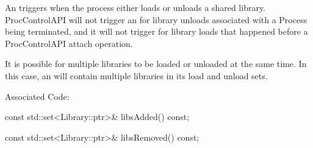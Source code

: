 
An  triggers when the process either loads or unloads a
shared library. ProcControlAPI will not trigger an  for
library unloads associated with a Process being terminated, and it will not
trigger  for library loads that happened before a
ProcControlAPI attach operation.

It is possible for multiple libraries to be loaded or unloaded at the same time.
In this case, an  will contain multiple libraries in its load
and unload sets.

Associated  Code: 

\begin{apient}
const std::set<Library::ptr>& libsAdded() const;
\end{apient}


\begin{apient}
const std::set<Library::ptr>& libsRemoved() const;
\end{apient}

